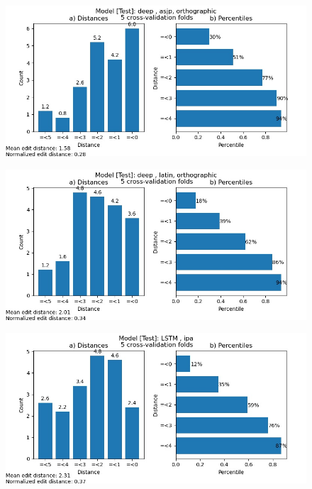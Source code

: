\begin{figure}
    \centering
    \includegraphics[width=\textwidth]{deep_test_asjp_ortho.jpg}
    \label{fig:sdtao}
\end{figure}

\begin{figure}
    \centering
    \includegraphics[width=\textwidth]{deep_test_latin_ortho.jpg}
    \label{fig:sdtlo}
\end{figure}

\begin{figure}
    \centering
    \includegraphics[width=\textwidth]{many2one_test_ipa.jpg}
    \label{fig:smti}
\end{figure}


